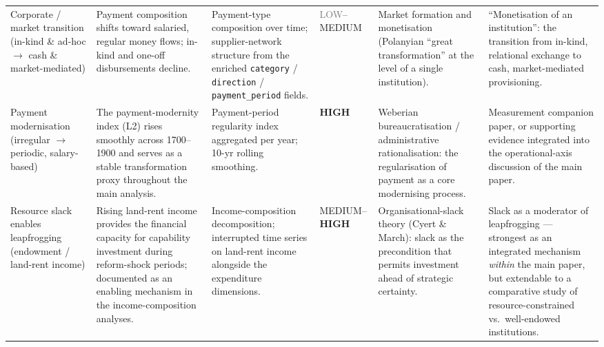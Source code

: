 \documentclass[11pt]{article}
\newcommand{\confhigh}[1]{\textcolor{green!45!black}{\textbf{#1}}}
\newcommand{\confmed}[1]{\textcolor{blue!55!black}{#1}}
\newcommand{\conflow}[1]{\textcolor{gray}{#1}}
\begin{document}
\begin{longtable}{P{2.4cm} P{4.2cm} P{3.2cm} P{1.5cm} P{4.0cm} P{4.2cm}}
Corporate / market transition (in-kind \& ad-hoc $\rightarrow$ cash \& market-mediated)
& Payment composition shifts toward salaried, regular money flows; in-kind and one-off disbursements decline.
& Payment-type composition over time; supplier-network structure from the enriched \texttt{category} / \texttt{direction} / \texttt{payment\_period} fields.
& \conflow{LOW}--\confmed{MEDIUM}
& Market formation and monetisation (Polanyian ``great transformation'' at the level of a single institution).
& ``Monetisation of an institution'': the transition from in-kind, relational exchange to cash, market-mediated provisioning. \\

Payment modernisation (irregular $\rightarrow$ periodic, salary-based)
& The payment-modernity index (L2) rises smoothly across 1700--1900 and serves as a stable transformation proxy throughout the main analysis.
& Payment-period regularity index aggregated per year; 10-yr rolling smoothing.
& \confhigh{HIGH}
& Weberian bureaucratisation / administrative rationalisation: the regularisation of payment as a core modernising process.
& Measurement companion paper, or supporting evidence integrated into the operational-axis discussion of the main paper. \\

Resource slack enables leapfrogging (endowment / land-rent income)
& Rising land-rent income provides the financial capacity for capability investment during reform-shock periods; documented as an enabling mechanism in the income-composition analyses.
& Income-composition decomposition; interrupted time series on land-rent income alongside the expenditure dimensions.
& \confmed{MEDIUM}--\confhigh{HIGH}
& Organisational-slack theory (Cyert \& March): slack as the precondition that permits investment ahead of strategic certainty.
& Slack as a moderator of leapfrogging --- strongest as an integrated mechanism \emph{within} the main paper, but extendable to a comparative study of resource-constrained vs.\ well-endowed institutions. \\

\end{longtable}

\normalsize
\bigskip
\end{document}
